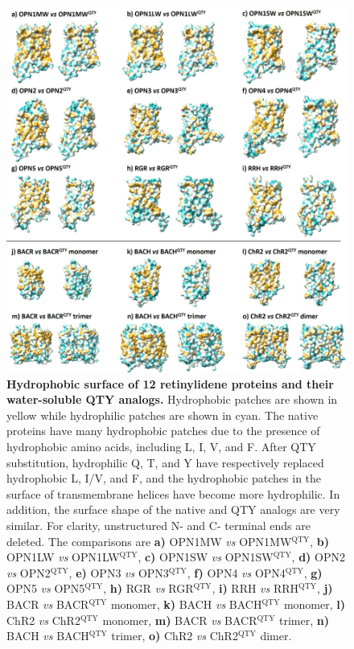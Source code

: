 \documentclass[fleqn, 10pt]{manuscript}
\begin{document}
\begin{figure}[htbp]
	\centering
	\includegraphics[width=\linewidth]{Figures/hydrophobicity.jpg}
	\caption{\textbf{Hydrophobic surface of 12 retinylidene proteins and their water-soluble QTY analogs. } Hydrophobic patches are shown in yellow while hydrophilic patches are shown in cyan. The native proteins have many hydrophobic patches due to the presence of hydrophobic amino acids, including L, I, V, and F. After QTY substitution, hydrophilic Q, T, and Y have respectively replaced hydrophobic L, I/V, and F, and the hydrophobic patches in the surface of transmembrane helices have become more hydrophilic. In addition, the surface shape of the native and QTY analogs are very similar. For clarity, unstructured N- and C- terminal ends are deleted. 
    The comparisons are 
    \textbf{a)} OPN1MW \textit{vs} OPN1MW$^{\textrm{QTY}}$, 
    \textbf{b)} OPN1LW \textit{vs} OPN1LW$^{\textrm{QTY}}$, 
    \textbf{c)} OPN1SW \textit{vs} OPN1SW$^{\textrm{QTY}}$, 
    \textbf{d)} OPN2 \textit{vs} OPN2$^{\textrm{QTY}}$, 
    \textbf{e)} OPN3 \textit{vs} OPN3$^{\textrm{QTY}}$, 
    \textbf{f)} OPN4 \textit{vs} OPN4$^{\textrm{QTY}}$, 
    \textbf{g)} OPN5 \textit{vs} OPN5$^{\textrm{QTY}}$, 
    \textbf{h)} RGR \textit{vs} RGR$^{\textrm{QTY}}$, 
    \textbf{i)} RRH \textit{vs} RRH$^{\textrm{QTY}}$, 
    \textbf{j)} BACR \textit{vs} BACR$^{\textrm{QTY}}$ monomer, 
    \textbf{k)} BACH \textit{vs} BACH$^{\textrm{QTY}}$ monomer, 
    \textbf{l)} ChR2 \textit{vs} ChR2$^{\textrm{QTY}}$ monomer, 
    \textbf{m)} BACR \textit{vs} BACR$^{\textrm{QTY}}$ trimer, 
    \textbf{n)} BACH \textit{vs} BACH$^{\textrm{QTY}}$ trimer, 
    \textbf{o)} ChR2 \textit{vs} ChR2$^{\textrm{QTY}}$ dimer. 
    }
	\label{fig:hydrophobicity}
\end{figure}
\end{document}
